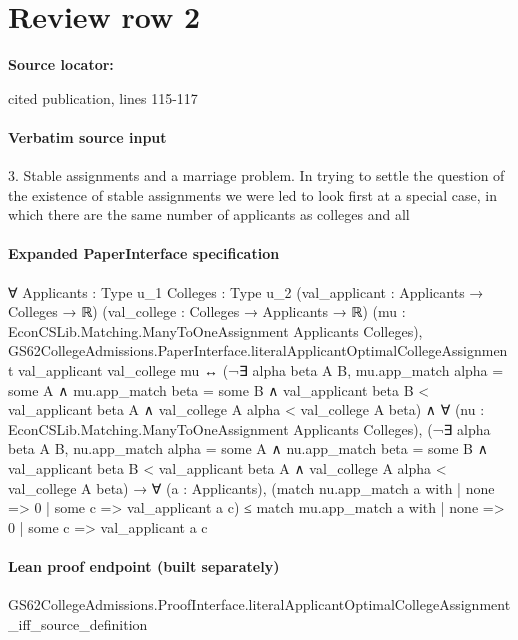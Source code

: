 \documentclass[10pt]{article}
\begin{document}
\section*{Review row 2}
\textbf{Source locator:} {\footnotesize\raggedright cited publication, lines 115-\allowbreak{}117\par}
\paragraph{Verbatim source input}
\begin{ReviewVerbatim}
3. Stable assignments and a marriage problem. In trying to settle the
question of the existence of stable assignments we were led to look first at a
special case, in which there are the same number of applicants as colleges and all
\end{ReviewVerbatim}


\paragraph{Expanded PaperInterface specification}
\begin{ReviewVerbatim}
∀ {Applicants : Type u_1} {Colleges : Type u_2} (val_applicant : Applicants → Colleges → ℝ)
  (val_college : Colleges → Applicants → ℝ) (mu : EconCSLib.Matching.ManyToOneAssignment Applicants Colleges),
  GS62CollegeAdmissions.PaperInterface.literalApplicantOptimalCollegeAssignment val_applicant val_college mu ↔
    (¬∃ alpha beta A B,
          mu.app_match alpha = some A ∧
            mu.app_match beta = some B ∧
              val_applicant beta B < val_applicant beta A ∧ val_college A alpha < val_college A beta) ∧
      ∀ (nu : EconCSLib.Matching.ManyToOneAssignment Applicants Colleges),
        (¬∃ alpha beta A B,
              nu.app_match alpha = some A ∧
                nu.app_match beta = some B ∧
                  val_applicant beta B < val_applicant beta A ∧ val_college A alpha < val_college A beta) →
          ∀ (a : Applicants),
            (match nu.app_match a with
              | none => 0
              | some c => val_applicant a c) ≤
              match mu.app_match a with
              | none => 0
              | some c => val_applicant a c
\end{ReviewVerbatim}

\paragraph{Lean proof endpoint (built separately)}\begin{ReviewVerbatim}
GS62CollegeAdmissions.ProofInterface.literalApplicantOptimalCollegeAssignment_iff_source_definition
\end{ReviewVerbatim}
\end{document}
